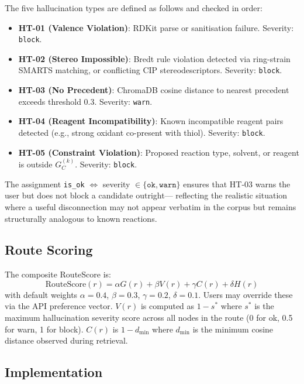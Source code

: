 \documentclass[12pt,a4paper]{article}
\begin{document}
The five hallucination types are defined as follows and checked in order:

\begin{itemize}
  \item \textbf{HT-01 (Valence Violation)}: RDKit parse or sanitisation failure.
        Severity: \texttt{block}.
  \item \textbf{HT-02 (Stereo Impossible)}: Bredt rule violation detected via
        ring-strain SMARTS matching, or conflicting CIP stereodescriptors.
        Severity: \texttt{block}.
  \item \textbf{HT-03 (No Precedent)}: ChromaDB cosine distance to nearest
        precedent exceeds threshold 0.3. Severity: \texttt{warn}.
  \item \textbf{HT-04 (Reagent Incompatibility)}: Known incompatible reagent
        pairs detected (e.g., strong oxidant co-present with thiol).
        Severity: \texttt{block}.
  \item \textbf{HT-05 (Constraint Violation)}: Proposed reaction type, solvent,
        or reagent is outside $G_C^{(k)}$.
        Severity: \texttt{block}.
\end{itemize}

The assignment \texttt{is\_ok} $\Leftrightarrow$ severity $\in \{\texttt{ok}, \texttt{warn}\}$
ensures that HT-03 warns the user but does not block a candidate outright—
reflecting the realistic situation where a useful disconnection may not appear
verbatim in the corpus but remains structurally analogous to known reactions.

\subsection{Route Scoring}

The composite RouteScore is:
\begin{equation}
  \text{RouteScore}(r) = \alpha G(r) + \beta V(r) + \gamma C(r) + \delta H(r)
\end{equation}
with default weights $\alpha = 0.4$, $\beta = 0.3$, $\gamma = 0.2$,
$\delta = 0.1$. Users may override these via the API preference vector.
$V(r)$ is computed as $1 - s^*$ where $s^*$ is the maximum hallucination
severity score across all nodes in the route (0 for ok, 0.5 for warn, 1 for
block). $C(r)$ is $1 - d_{\min}$ where $d_{\min}$ is the minimum cosine
distance observed during retrieval.

\subsection{Implementation}
\end{document}
